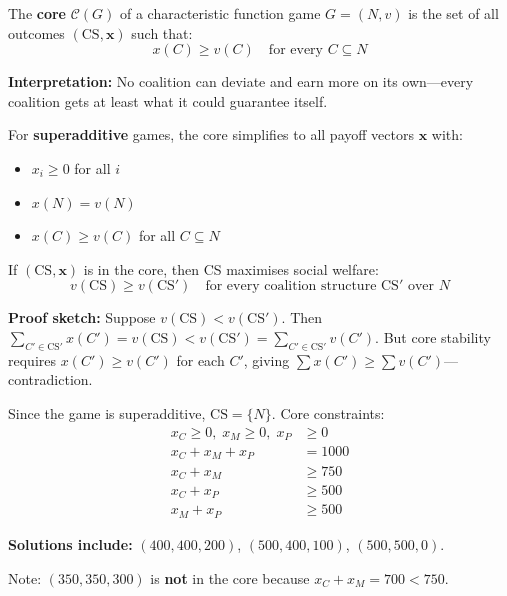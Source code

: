 \begin{defbox}
The \textbf{core} $\mathcal{C}(G)$ of a characteristic function game $G = (N, v)$ is the set of all outcomes $(\text{CS}, \mathbf{x})$ such that:
\[
x(C) \geq v(C) \quad \text{for every } C \subseteq N
\]

\textbf{Interpretation:} No coalition can deviate and earn more on its own---every coalition gets at least what it could guarantee itself.

For \textbf{superadditive} games, the core simplifies to all payoff vectors $\mathbf{x}$ with:
\begin{itemize}
  \item $x_i \geq 0$ for all $i$
  \item $x(N) = v(N)$
  \item $x(C) \geq v(C)$ for all $C \subseteq N$
\end{itemize}
\end{defbox}

\begin{thmbox}
If $(\text{CS}, \mathbf{x})$ is in the core, then CS maximises social welfare:
\[
v(\text{CS}) \geq v(\text{CS}') \quad \text{for every coalition structure CS}' \text{ over } N
\]

\textbf{Proof sketch:} Suppose $v(\text{CS}) < v(\text{CS}')$. Then $\sum_{C' \in \text{CS}'} x(C') = v(\text{CS}) < v(\text{CS}') = \sum_{C' \in \text{CS}'} v(C')$. But core stability requires $x(C') \geq v(C')$ for each $C'$, giving $\sum x(C') \geq \sum v(C')$---contradiction.
\end{thmbox}

\begin{exbox}
Since the game is superadditive, $\text{CS} = \{N\}$. Core constraints:
\begin{align*}
x_C \geq 0,\; x_M \geq 0,\; x_P &\geq 0 \\
x_C + x_M + x_P &= 1000 \\
x_C + x_M &\geq 750 \\
x_C + x_P &\geq 500 \\
x_M + x_P &\geq 500
\end{align*}

\textbf{Solutions include:} $(400, 400, 200)$, $(500, 400, 100)$, $(500, 500, 0)$.

Note: $(350, 350, 300)$ is \textbf{not} in the core because $x_C + x_M = 700 < 750$.
\end{exbox}

